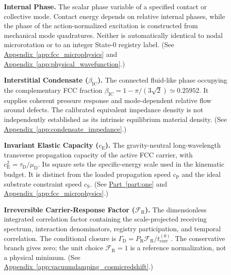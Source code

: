 \begin{description}
\item[] \begin{minipage}[t]{\linewidth}
\textbf{Internal Phase.} The scalar phase variable of a specified contact or collective mode. Contact energy depends on relative internal phases, while the phase of the action-normalized excitation is constructed from mechanical mode quadratures. Neither is automatically identical to nodal microrotation or to an integer State-0 registry label.
(See \hyperref[app:fcc_microphysics]{Appendix~\ref*{app:fcc_microphysics}} and \hyperref[app:physical_wavefunction]{Appendix~\ref*{app:physical_wavefunction}}.)
\end{minipage}

\item[] \begin{minipage}[t]{\linewidth}
\textbf{Interstitial Condensate ($\beta_{\mathrm{IC}}$).} The connected fluid-like phase occupying the complementary FCC fraction $\beta_{\mathrm{IC}}=1-\pi/(3\sqrt2)\simeq0.25952$. It supplies coherent pressure response and mode-dependent relative flow around defects. The calibrated equivalent impedance density is not independently established as its intrinsic equilibrium material density.
(See \hyperref[app:condensate_impedance]{Appendix~\ref*{app:condensate_impedance}}.)
\end{minipage}

\item[] \begin{minipage}[t]{\linewidth}
\textbf{Invariant Elastic Capacity ($c_{\mathrm E}$).} The gravity-neutral long-wavelength transverse propagation capacity of the active FCC carrier, with $c_{\mathrm E}^2=\tau_{\mathrm D}/\mu_{\mathrm D}$. Its square sets the specific-energy scale used in the kinematic budget. It is distinct from the loaded propagation speed $c_{\mathrm P}$ and the ideal substrate constraint speed $c_{\mathrm S}$.
(See \hyperref[part:one]{Part~\ref*{part:one}} and \hyperref[app:fcc_microphysics]{Appendix~\ref*{app:fcc_microphysics}}.)
\end{minipage}

\item[] \begin{minipage}[t]{\linewidth}
\textbf{Irreversible Carrier-Response Factor ($\mathcal F_{\mathrm R}$).} The dimensionless integrated correlation factor containing the scale-projected receiving spectrum, interaction denominators, registry participation, and temporal correlation. The conditional closure is $\Gamma_{\mathrm D}=P_{\mathrm R}\mathcal F_{\mathrm R}/t_{\mathrm{corr}}^{(0)}$. The conservative branch gives zero; the unit choice $\mathcal F_{\mathrm R}=1$ is a reference normalization, not a physical minimum.
(See \hyperref[app:vacuumdamping_cosmicredshift]{Appendix~\ref*{app:vacuumdamping_cosmicredshift}}.)
\end{minipage}


\end{description}
